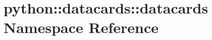 \hypertarget{namespacepython_1_1datacards_1_1datacards}{
\section{python::datacards::datacards Namespace Reference}
\label{namespacepython_1_1datacards_1_1datacards}
}
